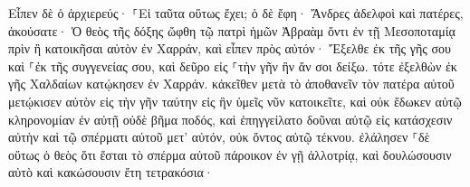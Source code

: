 \documentclass{openreader}
\begin{document}
Εἶπεν δὲ ὁ ἀρχιερεύς· ⸀Εἰ ταῦτα οὕτως ἔχει; 
ὁ δὲ ἔφη· Ἄνδρες ἀδελφοὶ καὶ πατέρες, ἀκούσατε· Ὁ θεὸς τῆς δόξης ὤφθη τῷ πατρὶ ἡμῶν Ἀβραὰμ ὄντι ἐν τῇ Μεσοποταμίᾳ πρὶν ἢ κατοικῆσαι αὐτὸν ἐν Χαρράν, 
καὶ εἶπεν πρὸς αὐτόν· Ἔξελθε ἐκ τῆς γῆς σου καὶ ⸀ἐκ τῆς συγγενείας σου, καὶ δεῦρο εἰς ⸀τὴν γῆν ἣν ἄν σοι δείξω. 
τότε ἐξελθὼν ἐκ γῆς Χαλδαίων κατῴκησεν ἐν Χαρράν. κἀκεῖθεν μετὰ τὸ ἀποθανεῖν τὸν πατέρα αὐτοῦ μετῴκισεν αὐτὸν εἰς τὴν γῆν ταύτην εἰς ἣν ὑμεῖς νῦν κατοικεῖτε, 
καὶ οὐκ ἔδωκεν αὐτῷ κληρονομίαν ἐν αὐτῇ οὐδὲ βῆμα ποδός, καὶ ἐπηγγείλατο δοῦναι αὐτῷ εἰς κατάσχεσιν αὐτὴν καὶ τῷ σπέρματι αὐτοῦ μετ’ αὐτόν, οὐκ ὄντος αὐτῷ τέκνου. 
ἐλάλησεν ⸀δὲ οὕτως ὁ θεὸς ὅτι ἔσται τὸ σπέρμα αὐτοῦ πάροικον ἐν γῇ ἀλλοτρίᾳ, καὶ δουλώσουσιν αὐτὸ καὶ κακώσουσιν ἔτη τετρακόσια· 
\end{document}
